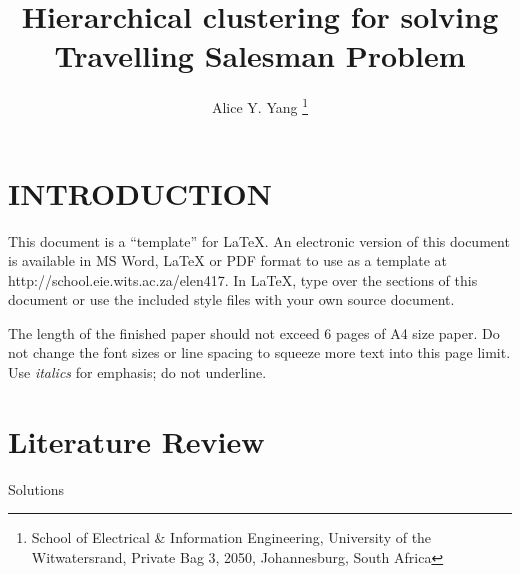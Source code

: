 \documentclass[10pt,twocolumn]{witseiepaper}
\begin{document}
\title{Hierarchical clustering for solving Travelling Salesman Problem}

\author{Alice Y. Yang
\thanks{School of Electrical \& Information Engineering, University of the
Witwatersrand, Private Bag 3, 2050, Johannesburg, South Africa}
}


%



\maketitle
\thispagestyle{empty}\pagestyle{empty}


%
\section{INTRODUCTION}

This document is a ``template'' for \LaTeX. An electronic version of this
document is available in MS Word, LaTeX or PDF format to use as a template at
http://school.eie.wits.ac.za/elen417.  In \LaTeX, type over the sections of
this document or use the included style files with your own source document.

The length of the finished paper should not exceed 6 pages of A4 size paper. Do
not change the font sizes or line spacing to squeeze more text into this page
limit. Use {\sl italics} for emphasis; do not underline.


%
\section{Literature Review}
Solutions
\end{document}
